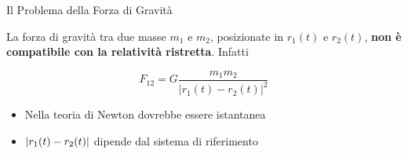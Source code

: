 %
%
%
%
%
%


\begin{frame}{Il Problema della Forza di Gravità}

    La forza di gravità tra due masse $m_1$ e $m_2$, posizionate in $r_1(t)$ e
    $r_2(t)$, \textbf{non è compatibile con la relatività ristretta}. Infatti

    \vspace{1cm}

    \begin{equation*}
        F_{12} = G \frac{m_1 m_2}{|r_1(t) - r_2(t)|^2}
    \end{equation*}

    \vspace{1cm}

    \begin{itemize}
        \item Nella teoria di Newton dovrebbe essere istantanea
        \item $\abs{r_1(t) - r_2(t)}$ dipende dal sistema di riferimento
    \end{itemize}

\end{frame}


